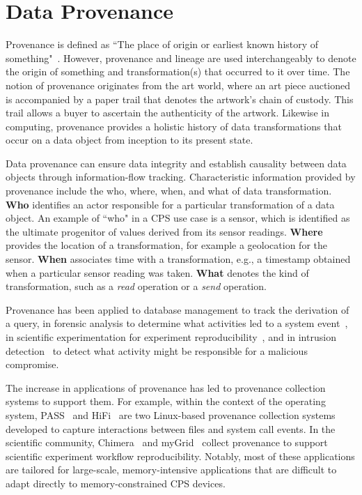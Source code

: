 \section{Data Provenance}

Provenance is defined as ``The place of origin or earliest known history of something"~\cite{TCDP1999}. However, provenance and lineage are used interchangeably to denote the origin of something and transformation(s) that occurred to it over time. The notion of provenance originates from the art world, where an art piece auctioned is accompanied by a paper trail that denotes the artwork's chain of custody. This trail allows a buyer to ascertain the authenticity of the artwork. Likewise in computing, provenance provides a holistic history of data transformations that occur on a data object from inception to its present state. 

Data provenance can ensure data integrity \cite{Bertino2015} and establish causality between data objects through information-flow tracking.
Characteristic information provided by provenance include the who, where, when, and what of data transformation. \textbf{Who} identifies an actor responsible for a particular transformation of a data object. An example of ``who" in a CPS use case is a sensor, which is identified as the ultimate progenitor of values derived from its sensor readings. \textbf{Where} provides the location of a transformation, for example a geolocation for the sensor. \textbf{When} associates time with a transformation, e.g., a timestamp obtained when a particular sensor reading was taken. \textbf{What} denotes the kind of transformation, such as a {\em read} operation or a {\em send} operation.

Provenance has been applied to database management to track the derivation of a query, in forensic analysis to determine what activities led to a system event~\cite{Bates2014LetSB, Lu:2010:SPE:1755688.1755723, 6542529}, in scientific experimentation for experiment reproducibility~\cite{chimera, Davidson:2008:PSW:1376616.1376772, altintas, Oinn2004TavernaAT}, and in intrusion detection~\cite{Xie_yulani, Fadolalkarim, 203308} to detect what activity might be responsible for a malicious compromise.

The increase in applications of provenance has led to provenance collection systems to support them. For example, within the context of the operating system, PASS~\cite{muniswamy_reddy} and HiFi~\cite{hi_fi} are two Linux-based provenance collection systems developed to capture interactions between files and system call events. In the scientific community, Chimera~\cite{chimera} and myGrid~\cite{Oinn2004TavernaAT} collect provenance to support scientific experiment workflow reproducibility. Notably, most of these applications are tailored for large-scale, memory-intensive applications that are difficult to adapt directly to memory-constrained CPS devices.





